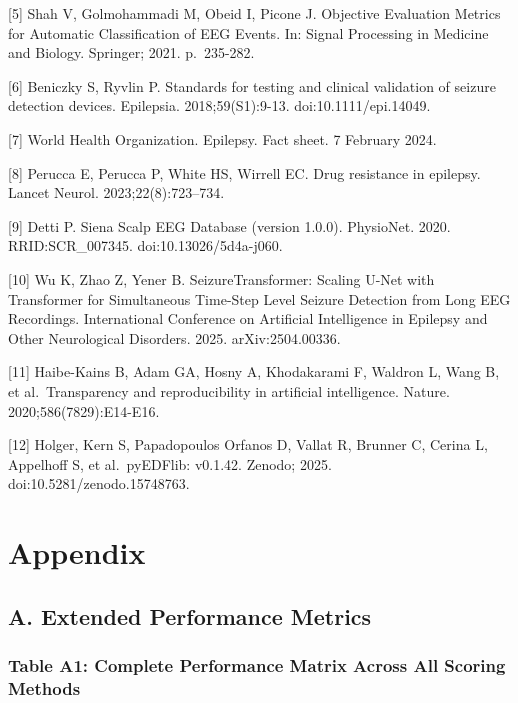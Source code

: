 \documentclass[
]{article}
\begin{document}
{[}5{]} Shah V, Golmohammadi M, Obeid I, Picone J. Objective Evaluation
Metrics for Automatic Classification of EEG Events. In: Signal
Processing in Medicine and Biology. Springer; 2021. p.~235-282.

{[}6{]} Beniczky S, Ryvlin P. Standards for testing and clinical
validation of seizure detection devices. Epilepsia. 2018;59(S1):9-13.
doi:10.1111/epi.14049.

{[}7{]} World Health Organization. Epilepsy. Fact sheet. 7 February
2024.

{[}8{]} Perucca E, Perucca P, White HS, Wirrell EC. Drug resistance in
epilepsy. Lancet Neurol. 2023;22(8):723--734.

{[}9{]} Detti P. Siena Scalp EEG Database (version 1.0.0). PhysioNet.
2020. RRID:SCR\_007345. doi:10.13026/5d4a-j060.

{[}10{]} Wu K, Zhao Z, Yener B. SeizureTransformer: Scaling U-Net with
Transformer for Simultaneous Time-Step Level Seizure Detection from Long
EEG Recordings. International Conference on Artificial Intelligence in
Epilepsy and Other Neurological Disorders. 2025. arXiv:2504.00336.

{[}11{]} Haibe-Kains B, Adam GA, Hosny A, Khodakarami F, Waldron L, Wang
B, et al.~Transparency and reproducibility in artificial intelligence.
Nature. 2020;586(7829):E14-E16.

{[}12{]} Holger, Kern S, Papadopoulos Orfanos D, Vallat R, Brunner C,
Cerina L, Appelhoff S, et al.~pyEDFlib: v0.1.42. Zenodo; 2025.
doi:10.5281/zenodo.15748763.

\hypertarget{appendix}{%
\section{Appendix}\label{appendix}}

\hypertarget{a.-extended-performance-metrics}{%
\subsection{A. Extended Performance
Metrics}\label{a.-extended-performance-metrics}}

\hypertarget{table-a1-complete-performance-matrix-across-all-scoring-methods}{%
\subsubsection{Table A1: Complete Performance Matrix Across All Scoring
Methods}\label{table-a1-complete-performance-matrix-across-all-scoring-methods}}
\end{document}
